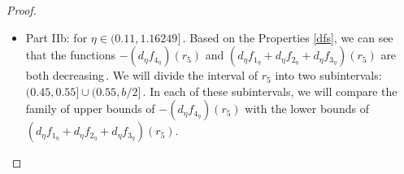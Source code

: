\documentclass[final,11pt]{article}
\numberwithin{equation}{section}
\theoremstyle{definition}
\begin{document}
\begin{proof}
\begin{itemize}
\begin{itemize}
\begin{itemize}
\underline{Families $L_{31_{\eta}}(0.582276)$ and $L_{36_{\eta}}(0.582276)$:} The family $L_{31_{\eta}}(0.582276)$ is strictly decreasing with its maximum value being $L_{31_{0.02}}(0.582276)=1.00089$\,. In contrast, $L_{36_{\eta}}(0.582276)$ is strictly increasing with its minimum value being $L_{36_{0.02}}(0.582276)=1.02002$\,. Consequently, 
$L_{31_{\eta}}(0.582276)<L_{36_{\eta}}(0.582276)$.
\end{itemize}

\item For $r_{5}\in(0.582276,b/2]$\,. Considering the Properties stated in \ref{dfs}, both families of functions are monotonically decreasing\,. Therefore, it suffices to compare the values of $\left(d_{\eta}f_{1_{\eta}}+d_{\eta}f_{2_{\eta}}+d_{\eta}f_{3_{\eta}}\right)(b/2)$ and $-\left(d_{\eta}f_{4_{\eta}}\right)(0.582276)$, which are functions of $\eta$\,. The  function $\left(d_{\eta}f_{1_{\eta}}+d_{\eta}f_{2_{\eta}}+d_{\eta}f_{3_{\eta}}\right) (b/2)$ is monotonically increasing, with its minimum value given by $\left(d_{\eta}f_{1_{0.02}}+d_{\eta}f_{2_{0.02}}+d_{\eta} f_{3_{0.02}}\right)(b/2)=1.00361$\,. Conversely, the function $-\left(d_{\eta}f_{4_{\eta}}\right)(0.582276)$ is monotonically decreasing with its maximum value being $-\left(d_{\eta} f_{4_{0.02}}\right)(0.582276)=0.953404$\,. Consequently, the inequality $-\left(d_{\eta}f_{4_{\eta}}\right)(r_{5})<\left(d_{\eta}f_{1_{\eta}}+d_{\eta }f_{2_{\eta}}+d_{\eta}f_{3_{\eta}}\right)(r_{5})$ its true.
\end{itemize}

\item Part IIb: for $\eta\in(0.11,1.16249]$\,. Based on the Properties \ref{dfs}, we can see that the functions $-\left(d_{\eta}f_{4_{\eta}}\right)(r_{5})$ and $\left(d_{\eta}f_{1_{\eta}}+d_{\eta}f_{2_{\eta}}+d_{\eta}f_{3_{\eta}}\right)(r_{5})$ are both decreasing\,. We will divide the interval of $r_{5}$ into two subintervals: $(0.45,0.55]\cup(0.55,b/2]$\,. In each of these subintervals, we will compare the family of upper bounds of $-\left(d_{\eta}f_{4_{\eta}}\right)(r_{5})$ with the lower bounds of $\left(d_{\eta}f_{1_{\eta}}+d_{\eta}f_{2_{\eta}}+d_{\eta}f_{3_{\eta}}\right)(r_{5})$.


\end{itemize}
\end{proof}
\end{document}

